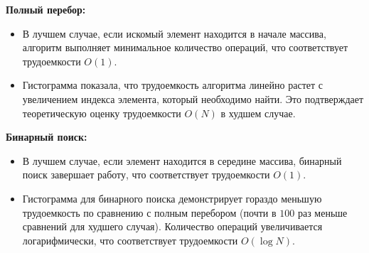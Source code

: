 \textbf{Полный перебор:}
\begin{itemize}
    \item В лучшем случае, если искомый элемент находится в начале массива, алгоритм выполняет минимальное количество операций, что соответствует трудоемкости $O(1)$.
    \item Гистограмма показала, что трудоемкость алгоритма линейно растет с увеличением индекса элемента, который необходимо найти. Это подтверждает теоретическую оценку трудоемкости $O(N)$ в худшем случае.
\end{itemize}

\textbf{Бинарный поиск:}
\begin{itemize}
    \item В лучшем случае, если элемент находится в середине массива, бинарный поиск завершает работу, что соответствует трудоемкости $O(1)$.
    \item Гистограмма для бинарного поиска демонстрирует гораздо меньшую трудоемкость по сравнению с полным перебором (почти в $100$ раз меньше сравнений для худшего случая). Количество операций увеличивается логарифмически, что соответствует трудоемкости $O(\log N)$.
\end{itemize}